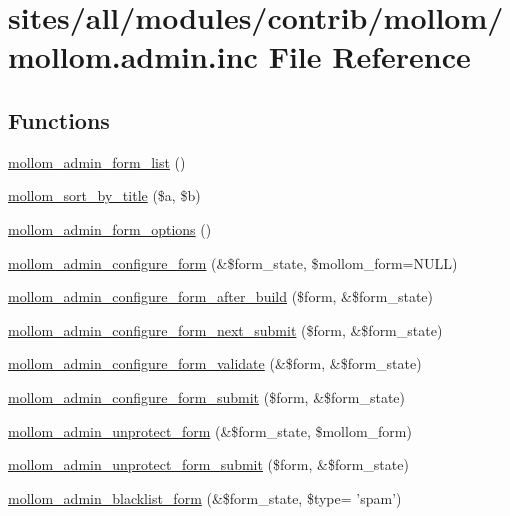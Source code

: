 \hypertarget{mollom_8admin_8inc}{
\section{sites/all/modules/contrib/mollom/mollom.admin.inc File Reference}
\label{mollom_8admin_8inc}
}
\subsection*{Functions}
\begin{CompactItemize}
\item 
\hyperlink{mollom_8admin_8inc_d38f5b9fd66d34954455d8acebfdeb3e}{mollom\_\-admin\_\-form\_\-list} ()
\item 
\hyperlink{mollom_8admin_8inc_e16b9fc7502f49e8a09771ce2566053b}{mollom\_\-sort\_\-by\_\-title} (\$a, \$b)
\item 
\hyperlink{mollom_8admin_8inc_e52028518c58476934227c248c38614c}{mollom\_\-admin\_\-form\_\-options} ()
\item 
\hyperlink{mollom_8admin_8inc_ef4774c8636c4437de390854c58b5852}{mollom\_\-admin\_\-configure\_\-form} (\&\$form\_\-state, \$mollom\_\-form=NULL)
\item 
\hyperlink{mollom_8admin_8inc_0565a3a427b7f3caee16a2ff658e77aa}{mollom\_\-admin\_\-configure\_\-form\_\-after\_\-build} (\$form, \&\$form\_\-state)
\item 
\hyperlink{mollom_8admin_8inc_4aa055b2b342650e86e6ecb46c92e5e2}{mollom\_\-admin\_\-configure\_\-form\_\-next\_\-submit} (\$form, \&\$form\_\-state)
\item 
\hyperlink{mollom_8admin_8inc_b6ebbb0ffebf1763d6ade7261b365c70}{mollom\_\-admin\_\-configure\_\-form\_\-validate} (\&\$form, \&\$form\_\-state)
\item 
\hyperlink{mollom_8admin_8inc_c2080295728d878025a0ed4c37cfc811}{mollom\_\-admin\_\-configure\_\-form\_\-submit} (\$form, \&\$form\_\-state)
\item 
\hyperlink{mollom_8admin_8inc_28f6764e8ab7d9d7007daed2051eabde}{mollom\_\-admin\_\-unprotect\_\-form} (\&\$form\_\-state, \$mollom\_\-form)
\item 
\hyperlink{mollom_8admin_8inc_655b63c140bb3be5132635c9af7fbbc9}{mollom\_\-admin\_\-unprotect\_\-form\_\-submit} (\$form, \&\$form\_\-state)
\item 
\hyperlink{mollom_8admin_8inc_258ff9526e5c2282bf3caa9d4e5b1d45}{mollom\_\-admin\_\-blacklist\_\-form} (\&\$form\_\-state, \$type= 'spam')

\end{CompactItemize}
